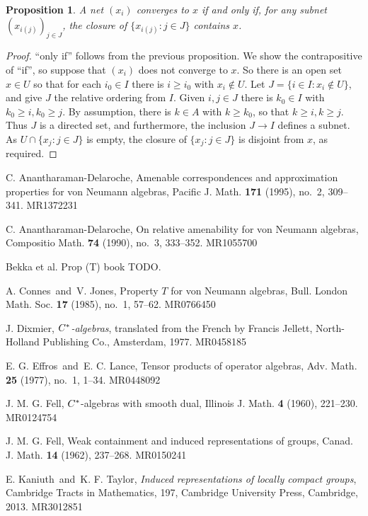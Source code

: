 \documentclass[a4paper,11pt]{article}
\newtheorem{proposition}[lemma]{Proposition}
\begin{document}
\begin{proposition}
A net $(x_i)$ converges to $x$ if and only if, for any subnet
$(x_{i(j)})_{j\in J}$, the closure of $\{ x_{i(j)} : j\in J \}$ contains $x$.
\end{proposition}
\begin{proof}
``only if'' follows from the previous proposition.  We show the contrapositive
of ``if'', so suppose that $(x_i)$ does not converge to $x$.  So there is an
open set $x\in U$ so that for each $i_0\in I$ there is $i\geq i_0$ with $x_i
\not\in U$.  Let $J = \{ i\in I : x_i\not\in U \}$, and give $J$ the relative
ordering from $I$.  Given $i,j\in J$ there is $k_0\in I$ with $k_0\geq i,
k_0\geq j$.  By assumption, there is $k\in A$ with $k\geq k_0$, so that $k\geq i,
k\geq j$.  Thus $J$ is a directed set, and furthermore, the inclusion
$J\rightarrow I$ defines a subnet.  As $U \cap \{ x_j : j\in J \}$ is empty,
the closure of $\{ x_j : j\in J \}$ is disjoint from $x$, as required.
\end{proof}


\begin{thebibliography}{99}

 C. Anantharaman-Delaroche, Amenable correspondences and approximation properties for von Neumann algebras, Pacific J. Math. {\bf 171} (1995), no.~2, 309--341. MR1372231

 C. Anantharaman-Delaroche, On relative amenability for von Neumann algebras, Compositio Math. {\bf 74} (1990), no.~3, 333--352. MR1055700

 Bekka et al. Prop (T) book TODO.

 A. Connes\ and\ V. Jones, Property $T$ for von Neumann algebras, Bull. London Math. Soc. {\bf 17} (1985), no.~1, 57--62. MR0766450

 J. Dixmier, {\it $C\sp*$-algebras}, translated from the French by Francis Jellett, North-Holland Publishing Co., Amsterdam, 1977. MR0458185

 E. G. Effros\ and\ E. C. Lance, Tensor products of operator algebras, Adv. Math. {\bf 25} (1977), no.~1, 1--34. MR0448092

 J. M. G. Fell, $C\sp{\ast} $-algebras with smooth dual, Illinois J. Math. {\bf 4} (1960), 221--230. MR0124754

 J. M. G. Fell, Weak containment and induced representations of groups, Canad. J. Math. {\bf 14} (1962), 237--268. MR0150241

 E. Kaniuth\ and\ K. F. Taylor, {\it Induced representations of locally compact groups}, Cambridge Tracts in Mathematics, 197, Cambridge University Press, Cambridge, 2013. MR3012851

\end{thebibliography}
\end{document}
